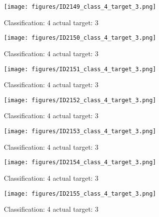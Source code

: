\begin{figure}[h!]
\begin{center}
\texttt{[image: figures/ID2149\_class\_4\_target\_3.png]}
\end{center}
\caption{ Classification: 4 actual target: 3}
\label{fig:ID2149_class_4_target_3}
\end{figure}
\begin{figure}[h!]
\begin{center}
\texttt{[image: figures/ID2150\_class\_4\_target\_3.png]}
\end{center}
\caption{ Classification: 4 actual target: 3}
\label{fig:ID2150_class_4_target_3}
\end{figure}
\begin{figure}[h!]
\begin{center}
\texttt{[image: figures/ID2151\_class\_4\_target\_3.png]}
\end{center}
\caption{ Classification: 4 actual target: 3}
\label{fig:ID2151_class_4_target_3}
\end{figure}
\begin{figure}[h!]
\begin{center}
\texttt{[image: figures/ID2152\_class\_4\_target\_3.png]}
\end{center}
\caption{ Classification: 4 actual target: 3}
\label{fig:ID2152_class_4_target_3}
\end{figure}
\begin{figure}[h!]
\begin{center}
\texttt{[image: figures/ID2153\_class\_4\_target\_3.png]}
\end{center}
\caption{ Classification: 4 actual target: 3}
\label{fig:ID2153_class_4_target_3}
\end{figure}
\begin{figure}[h!]
\begin{center}
\texttt{[image: figures/ID2154\_class\_4\_target\_3.png]}
\end{center}
\caption{ Classification: 4 actual target: 3}
\label{fig:ID2154_class_4_target_3}
\end{figure}
\begin{figure}[h!]
\begin{center}
\texttt{[image: figures/ID2155\_class\_4\_target\_3.png]}
\end{center}
\caption{ Classification: 4 actual target: 3}
\label{fig:ID2155_class_4_target_3}
\end{figure}
